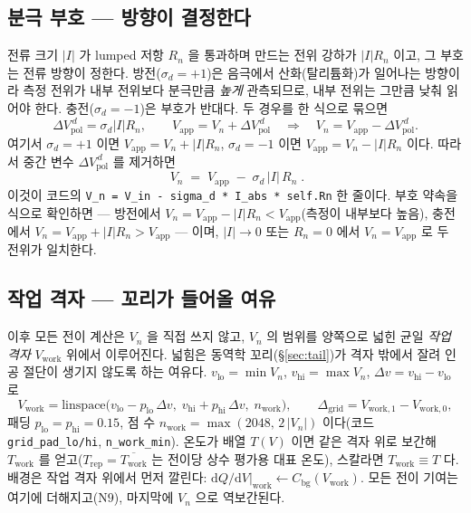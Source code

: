 \documentclass[11pt,a4paper]{article}
\newcommand{\dd}{\mathrm{d}}
\newcommand{\app}{\mathrm{app}}
\newcommand{\bg}{\mathrm{bg}}
\newcommand{\work}{\mathrm{work}}
\newcommand{\code}[1]{\texttt{#1}}
\begin{document}
\subsection{분극 부호 — 방향이 결정한다}
전류 크기 $|I|$ 가 lumped 저항 $R_n$ 을 통과하며 만드는 전위 강하가 $|I|R_n$ 이고, 그 부호는 전류 방향이 정한다.
방전($\sigma_d=+1$)은 음극에서 산화(탈리튬화)가 일어나는 방향이라 측정 전위가 내부 전위보다 분극만큼 \emph{높게}
관측되므로, 내부 전위는 그만큼 낮춰 읽어야 한다. 충전($\sigma_d=-1$)은 부호가 반대다. 두 경우를 한 식으로 묶으면
\begin{equation}
\Delta V_{\mathrm{pol}}^{\,d}=\sigma_d |I|R_n,\qquad
V_\app=V_n+\Delta V_{\mathrm{pol}}^{\,d}
\quad\Longrightarrow\quad
V_n=V_\app-\Delta V_{\mathrm{pol}}^{\,d}.
\label{eq:vnderive}
\end{equation}
여기서 $\sigma_d=+1$ 이면 $V_\app=V_n+|I|R_n$, $\sigma_d=-1$ 이면 $V_\app=V_n-|I|R_n$ 이다. 따라서 중간 변수
$\Delta V_{\mathrm{pol}}^{\,d}$ 를 제거하면
\begin{equation}
\boxed{\;V_n\;=\;V_\app\;-\;\sigma_d\,|I|\,R_n\;.}
\label{eq:vn}
\end{equation}
이것이 코드의 \code{V\_n = V\_in - sigma\_d * I\_abs * self.Rn} 한 줄이다. 부호 약속을 식으로 확인하면 —
방전에서 $V_n=V_\app-|I|R_n<V_\app$(측정이 내부보다 높음), 충전에서 $V_n=V_\app+|I|R_n>V_\app$ — 이며,
$|I|\to0$ 또는 $R_n=0$ 에서 $V_n=V_\app$ 로 두 전위가 일치한다.

\subsection{작업 격자 — 꼬리가 들어올 여유}
이후 모든 전이 계산은 $V_n$ 을 직접 쓰지 않고, $V_n$ 의 범위를 양쪽으로 넓힌 균일 \emph{작업 격자} $V_\work$ 위에서
이루어진다. 넓힘은 동역학 꼬리(\S\ref{sec:tail})가 격자 밖에서 잘려 인공 절단이 생기지 않도록 하는 여유다.
$v_\mathrm{lo}=\min V_n$, $v_\mathrm{hi}=\max V_n$, $\Delta v=v_\mathrm{hi}-v_\mathrm{lo}$ 로
\begin{equation}
V_\work=\mathrm{linspace}\big(v_\mathrm{lo}-p_\mathrm{lo}\,\Delta v,\;
v_\mathrm{hi}+p_\mathrm{hi}\,\Delta v,\;n_\work\big),
\qquad \Delta_\mathrm{grid}=V_{\work,1}-V_{\work,0},
\label{eq:vwork}
\end{equation}
패딩 $p_\mathrm{lo}=p_\mathrm{hi}=0.15$, 점 수 $n_\work=\max(2048,\,2\,|V_n|)$ 이다(코드 \code{grid\_pad\_lo/hi},
\code{n\_work\_min}). 온도가 배열 $T(V)$ 이면 같은 격자 위로 보간해 $T_\work$ 를 얻고($T_\mathrm{rep}=\overline{T_\work}$ 는
전이당 상수 평가용 대표 온도), 스칼라면 $T_\work\equiv T$ 다. 배경은 작업 격자 위에서 먼저 깔린다:
$\dd Q/\dd V|_\work \leftarrow C_\bg(V_\work)$. 모든 전이 기여는 여기에 더해지고($\mathrm N9$), 마지막에 $V_n$ 으로
역보간된다.
\end{document}
